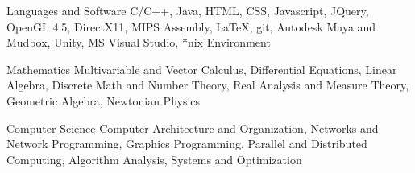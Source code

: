 


\begin{cvskills}


\cvskill
{Languages and Software} %
{C/C++, Java, HTML, CSS, Javascript, JQuery, OpenGL 4.5, DirectX11, MIPS Assembly,
LaTeX, git, Autodesk Maya and Mudbox, Unity,  MS Visual Studio, *nix Environment} %


\cvskill
{Mathematics} %
{Multivariable and Vector Calculus, Differential Equations, Linear Algebra, Discrete Math and Number Theory, Real Analysis and Measure Theory, Geometric Algebra, Newtonian Physics} %


\cvskill
{Computer Science} %
{Computer Architecture and Organization, Networks and Network Programming, Graphics Programming, Parallel and Distributed Computing, Algorithm Analysis, Systems and Optimization} %


\end{cvskills}